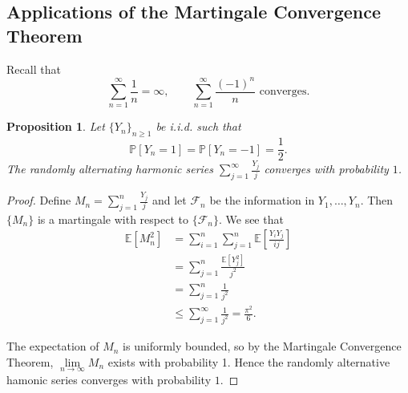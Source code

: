 \documentclass{tufte-handout}
\newcommand*\E{\mathbb{E}}
\renewcommand*\P{\mathbb{P}}
\newtheorem{prop}[thm]{Proposition}
\theoremstyle{definition}
\begin{document}
\subsection{Applications of the Martingale Convergence Theorem}

Recall that \[
	\sum\limits_{n=1}^{\infty} \frac{1}{n} = \infty, \qquad \sum\limits_{n=1}^{\infty} \frac{\left( -1 \right)^{n}}{n} \text{ converges}
.\] 
\begin{prop}
	Let $\{Y_n\}_{n\ge 1}$ be i.i.d. such that \[\P\left[Y_n = 1\right] = \P\left[Y_n = -1\right] = \frac{1}{2}.\]
	The randomly alternating harmonic series $\sum\limits_{j=1}^{\infty} \frac{Y_j}{j} $ converges with probability $1$.
\end{prop}
\begin{proof}
	Define $M_n = \sum\limits_{j=1}^{n} \frac{Y_j}{j}$ and let $\mathscr{F}_n$ be the information in $Y_1,\ldots,Y_n$. Then $\{M_n\}$ is a martingale with respect to $\{\mathscr{F}_n\}$. 
	We see that
	\begin{align*}
		\E\left[M_n^2\right] &= \sum\limits_{i=1}^{n} \sum\limits_{j=1}^{n} \E\left[\frac{Y_i Y_j}{ij}\right]  \\
		&= \sum\limits_{j=1}^{n} \frac{\E\left[Y_j^2\right] }{j^2} \\
		&= \sum\limits_{j=1}^{n} \frac{1}{j^2} \\
		&\le \sum\limits_{j=1}^{\infty} \frac{1}{j^2} = \frac{\pi^2}{6}
	.\end{align*}

	The expectation of $M_n$ is uniformly bounded, so by the Martingale Convergence Theorem, $\lim\limits_{n \to \infty} M_n$ exists with probability 1. Hence the randomly alternative hamonic series converges with probability $1$.
\end{proof}
\end{document}

